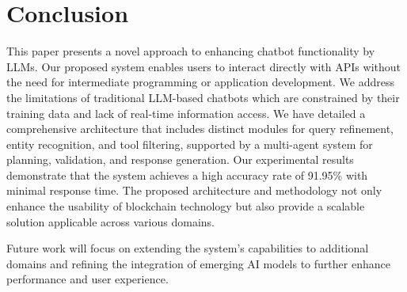 \documentclass[runningheads]{llncs}
\begin{document}
\section{Conclusion}
\label{sec:conclusion}
This paper presents a novel approach to enhancing chatbot functionality by LLMs. Our proposed system enables users to interact directly with APIs without the need for intermediate programming or application development. We address the limitations of traditional LLM-based chatbots which are constrained by their training data and lack of real-time information access. We have detailed a comprehensive architecture that includes distinct modules for query refinement, entity recognition, and tool filtering, supported by a multi-agent system for planning, validation, and response generation. Our experimental results demonstrate that the system achieves a high accuracy rate of 91.95\% with minimal response time. The proposed architecture and methodology not only enhance the usability of blockchain technology but also provide a scalable solution applicable across various domains. 

Future work will focus on extending the system’s capabilities to additional domains and refining the integration of emerging AI models to further enhance performance and user experience.




%
%
%
% 
% 
\printbibliography





\end{document}
